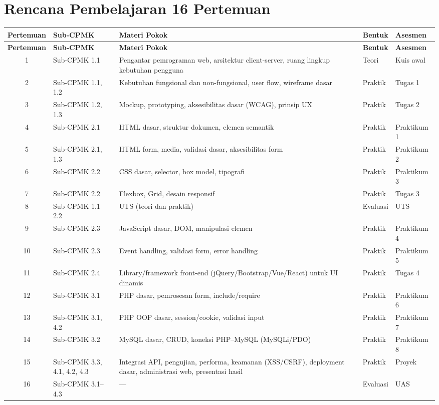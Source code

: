 \section{Rencana Pembelajaran 16 Pertemuan}

{\small
\setlength{\tabcolsep}{3pt}
\begin{longtable}{|c|>{\raggedright\arraybackslash}p{2.2cm}|>{\raggedright\arraybackslash}p{4.6cm}|>{\raggedright\arraybackslash}p{1.5cm}|>{\raggedright\arraybackslash}p{2cm}|}
\hline
\textbf{Pertemuan} & \textbf{Sub-CPMK} & \textbf{Materi Pokok} & \textbf{Bentuk} & \textbf{Asesmen} \\
\hline
\endfirsthead

\hline
\textbf{Pertemuan} & \textbf{Sub-CPMK} & \textbf{Materi Pokok} & \textbf{Bentuk} & \textbf{Asesmen} \\
\hline
\endhead

\hline
\endfoot

1 & Sub-CPMK 1.1 & Pengantar pemrograman web, arsitektur client-server, ruang lingkup kebutuhan pengguna & Teori & Kuis awal \\
\hline
2 & Sub-CPMK 1.1, 1.2 & Kebutuhan fungsional dan non-fungsional, user flow, wireframe dasar & Praktik & Tugas 1 \\
\hline
3 & Sub-CPMK 1.2, 1.3 & Mockup, prototyping, aksesibilitas dasar (WCAG), prinsip UX & Praktik & Tugas 2 \\
\hline
4 & Sub-CPMK 2.1 & HTML dasar, struktur dokumen, elemen semantik & Praktik & Praktikum 1 \\
\hline
5 & Sub-CPMK 2.1, 1.3 & HTML form, media, validasi dasar, aksesibilitas form & Praktik & Praktikum 2 \\
\hline
6 & Sub-CPMK 2.2 & CSS dasar, selector, box model, tipografi & Praktik & Praktikum 3 \\
\hline
7 & Sub-CPMK 2.2 & Flexbox, Grid, desain responsif & Praktik & Tugas 3 \\
\hline
8 & Sub-CPMK 1.1--2.2 & UTS (teori dan praktik) & Evaluasi & UTS \\
\hline
9 & Sub-CPMK 2.3 & JavaScript dasar, DOM, manipulasi elemen & Praktik & Praktikum 4 \\
\hline
10 & Sub-CPMK 2.3 & Event handling, validasi form, error handling & Praktik & Praktikum 5 \\
\hline
11 & Sub-CPMK 2.4 & Library/framework front-end (jQuery/Bootstrap/Vue/React) untuk UI dinamis & Praktik & Tugas 4 \\
\hline
12 & Sub-CPMK 3.1 & PHP dasar, pemrosesan form, include/require & Praktik & Praktikum 6 \\
\hline
13 & Sub-CPMK 3.1, 4.2 & PHP OOP dasar, session/cookie, validasi input & Praktik & Praktikum 7 \\
\hline
14 & Sub-CPMK 3.2 & MySQL dasar, CRUD, koneksi PHP--MySQL (MySQLi/PDO) & Praktik & Praktikum 8 \\
\hline
15 & Sub-CPMK 3.3, 4.1, 4.2, 4.3 & Integrasi API, pengujian, performa, keamanan (XSS/CSRF), deployment dasar, administrasi web, presentasi hasil & Praktik & Proyek \\
\hline
16 & Sub-CPMK 3.1--4.3 & --- & Evaluasi & UAS \\
\hline
\end{longtable}
}
